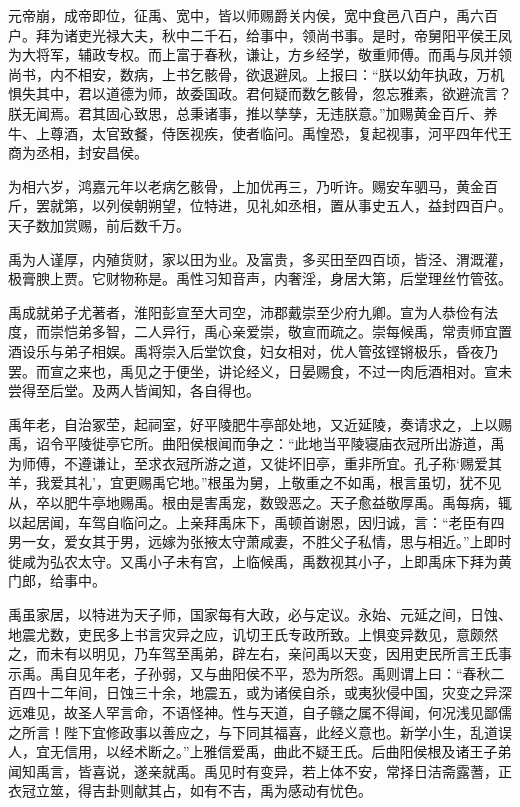\documentclass[12pt,UTF8]{ctexbook}
\begin{document}
元帝崩，成帝即位，征禹、宽中，皆以师赐爵关内侯，宽中食邑八百户，禹六百户。拜为诸吏光禄大夫，秋中二千石，给事中，领尚书事。是时，帝舅阳平侯王凤为大将军，辅政专权。而上富于春秋，谦让，方乡经学，敬重师傅。而禹与凤并领尚书，内不相安，数病，上书乞骸骨，欲退避凤。上报曰：“朕以幼年执政，万机惧失其中，君以道德为师，故委国政。君何疑而数乞骸骨，忽忘雅素，欲避流言？朕无闻焉。君其固心致思，总秉诸事，推以孳孳，无违朕意。”加赐黄金百斤、养牛、上尊酒，太官致餐，侍医视疾，使者临问。禹惶恐，复起视事，河平四年代王商为丞相，封安昌侯。



为相六岁，鸿嘉元年以老病乞骸骨，上加优再三，乃听许。赐安车驷马，黄金百斤，罢就第，以列侯朝朔望，位特进，见礼如丞相，置从事史五人，益封四百户。天子数加赏赐，前后数千万。



禹为人谨厚，内殖货财，家以田为业。及富贵，多买田至四百顷，皆泾、渭溉灌，极膏腴上贾。它财物称是。禹性习知音声，内奢淫，身居大第，后堂理丝竹管弦。



禹成就弟子尤著者，淮阳彭宣至大司空，沛郡戴崇至少府九卿。宣为人恭俭有法度，而崇恺弟多智，二人异行，禹心亲爱崇，敬宣而疏之。崇每候禹，常责师宜置酒设乐与弟子相娱。禹将崇入后堂饮食，妇女相对，优人管弦铿锵极乐，昏夜乃罢。而宣之来也，禹见之于便坐，讲论经义，日晏赐食，不过一肉卮酒相对。宣未尝得至后堂。及两人皆闻知，各自得也。



禹年老，自治冢茔，起祠室，好平陵肥牛亭部处地，又近延陵，奏请求之，上以赐禹，诏令平陵徙亭它所。曲阳侯根闻而争之：“此地当平陵寝庙衣冠所出游道，禹为师傅，不遵谦让，至求衣冠所游之道，又徙坏旧亭，重非所宜。孔子称‘赐爱其羊，我爱其礼’，宜更赐禹它地。”根虽为舅，上敬重之不如禹，根言虽切，犹不见从，卒以肥牛亭地赐禹。根由是害禹宠，数毁恶之。天子愈益敬厚禹。禹每病，辄以起居闻，车驾自临问之。上亲拜禹床下，禹顿首谢恩，因归诚，言：“老臣有四男一女，爱女其于男，远嫁为张掖太守萧咸妻，不胜父子私情，思与相近。”上即时徙咸为弘农太守。又禹小子未有宫，上临候禹，禹数视其小子，上即禹床下拜为黄门郎，给事中。



禹虽家居，以特进为天子师，国家每有大政，必与定议。永始、元延之间，日蚀、地震尤数，吏民多上书言灾异之应，讥切王氏专政所致。上惧变异数见，意颇然之，而未有以明见，乃车驾至禹弟，辟左右，亲问禹以天变，因用吏民所言王氏事示禹。禹自见年老，子孙弱，又与曲阳侯不平，恐为所怨。禹则谓上曰：“春秋二百四十二年间，日蚀三十余，地震五，或为诸侯自杀，或夷狄侵中国，灾变之异深远难见，故圣人罕言命，不语怪神。性与天道，自子赣之属不得闻，何况浅见鄙儒之所言！陛下宜修政事以善应之，与下同其福喜，此经义意也。新学小生，乱道误人，宜无信用，以经术断之。”上雅信爱禹，曲此不疑王氏。后曲阳侯根及诸王子弟闻知禹言，皆喜说，遂亲就禹。禹见时有变异，若上体不安，常择日洁斋露蓍，正衣冠立筮，得吉卦则献其占，如有不吉，禹为感动有忧色。
\end{document}
